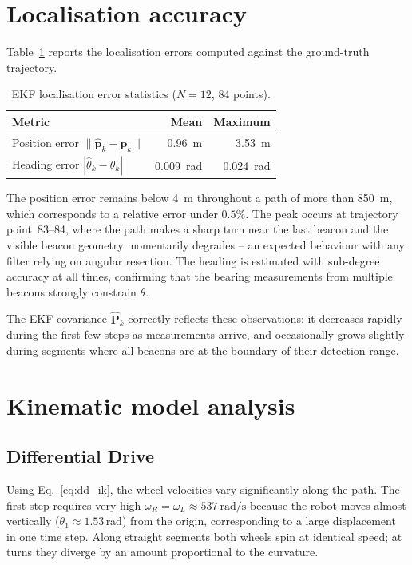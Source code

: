 \documentclass[a4paper,11pt]{report}
\begin{document}
\section{Localisation accuracy}

Table~\ref{tab:errors} reports the localisation errors computed against the ground-truth trajectory.

\begin{table}[H]
  \centering
  \caption{EKF localisation error statistics ($N = 12$, 84 points).}
  \label{tab:errors}
  \begin{tabular}{lrr}
    \toprule
    Metric & Mean & Maximum \\
    \midrule
    Position error $\|\hat{\bm{p}}_k - \bm{p}_k\|$ & \SI{0.96}{\metre}     & \SI{3.53}{\metre} \\
    Heading error $|\hat\theta_k - \theta_k|$        & \SI{0.009}{\radian}   & \SI{0.024}{\radian} \\
    \bottomrule
  \end{tabular}
\end{table}

The position error remains below \SI{4}{\metre} throughout a path of more than \SI{850}{\metre}, which corresponds to a relative error under $0.5\%$.  The peak occurs at trajectory point~83--84, where the path makes a sharp turn near the last beacon and the visible beacon geometry momentarily degrades -- an expected behaviour with any filter relying on angular resection.  The heading is estimated with sub-degree accuracy at all times, confirming that the bearing measurements from multiple beacons strongly constrain $\theta$.

The EKF covariance $\hat{\mathbf{P}}_k$ correctly reflects these observations: it decreases rapidly during the first few steps as measurements arrive, and occasionally grows slightly during segments where all beacons are at the boundary of their detection range.

\section{Kinematic model analysis}

\subsection{Differential Drive}

Using Eq.~\eqref{eq:dd_ik}, the wheel velocities vary significantly along the path.  The first step requires very high $\omega_R = \omega_L \approx \SI{537}{\radian\per\second}$ because the robot moves almost vertically ($\theta_1 \approx 1.53$\,rad) from the origin, corresponding to a large displacement in one time step.  Along straight segments both wheels spin at identical speed; at turns they diverge by an amount proportional to the curvature.
\end{document}
